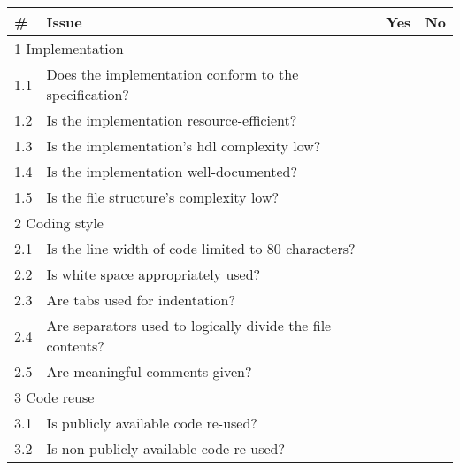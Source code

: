 \documentclass[%
	a4paper,
]
{article}
\begin{document}
\begin{table}[h!]
	\centering
	\renewcommand{\arraystretch}{2}
	\begin{tabular}{
		|p{.025\linewidth}
		|p{.75\linewidth}
		|p{.05\linewidth}
		|p{.05\linewidth}|
	}

		\hline
		\textbf{\#} & \textbf{Issue} & \textbf{Yes} & \textbf{No} \\
		\hline

		\multicolumn{4}{|p{.95\linewidth}|}{\cellcolor{gray!20} 1 Implementation}
			\\\hline

		1.1 & Does the implementation conform to the specification? & & \\\hline

		1.2 & Is the implementation resource-efficient? & & \\\hline

		1.3 & Is the implementation's \gls{hdl} complexity low? & & \\\hline

		1.4 & Is the implementation well-documented? & & \\\hline

		1.5 & Is the file structure's complexity low? & & \\\hline

		\multicolumn{4}{|p{.95\linewidth}|}{\cellcolor{gray!20} 2 Coding style}
			\\\hline

		2.1 & Is the line width of code limited to 80 characters?
			& & \\\hline

		2.2 & Is white space appropriately used? & & \\\hline

		2.3 & Are tabs used for indentation? & & \\\hline

		2.4 & Are separators used to logically divide the file contents? & & \\\hline

		2.5 & Are meaningful comments given? & & \\\hline

		\multicolumn{4}{|p{.95\linewidth}|}{\cellcolor{gray!20} 3 Code reuse} \\\hline

		3.1 & Is publicly available code re-used? & & \\\hline

		3.2 & Is non-publicly available code re-used? & & \\\hline


\end{tabular}
\end{table}
\end{document}

